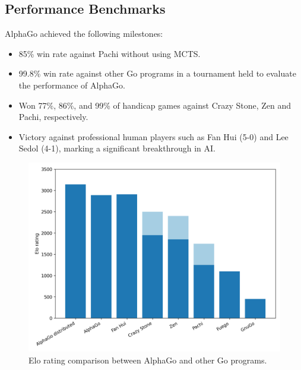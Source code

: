 \subsection{Performance Benchmarks}
AlphaGo achieved the following milestones:
\begin{itemize}
    \item 85\% win rate against Pachi without using MCTS.
    \item 99.8\% win rate against other Go programs in a tournament held to evaluate the performance of AlphaGo.
    \item Won 77\%, 86\%, and 99\% of handicap games against Crazy Stone, Zen and Pachi,
          respectively.
    \item Victory against professional human players such as Fan Hui (5-0) and Lee Sedol
          (4-1), marking a significant breakthrough in AI.
\end{itemize}

\begin{figure}[htbp]
    \centering
    \includegraphics[width=\linewidth, keepaspectratio]{sections/4AlphaGo/comparison.png}
    \caption{Elo rating comparison between AlphaGo and other Go programs.}
\end{figure}
